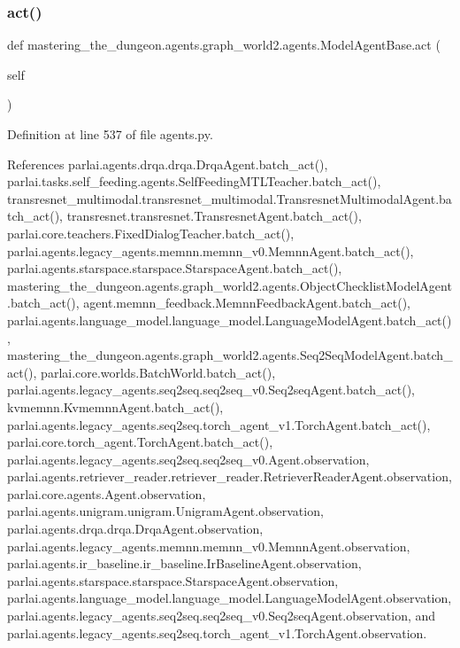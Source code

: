 \subsubsection{\texorpdfstring{act()}{act()}}
{\footnotesize\ttfamily def mastering\+\_\+the\+\_\+dungeon.\+agents.\+graph\+\_\+world2.\+agents.\+Model\+Agent\+Base.\+act (\begin{DoxyParamCaption}\item[{}]{self }\end{DoxyParamCaption})}



Definition at line 537 of file agents.\+py.



References parlai.\+agents.\+drqa.\+drqa.\+Drqa\+Agent.\+batch\+\_\+act(), parlai.\+tasks.\+self\+\_\+feeding.\+agents.\+Self\+Feeding\+M\+T\+L\+Teacher.\+batch\+\_\+act(), transresnet\+\_\+multimodal.\+transresnet\+\_\+multimodal.\+Transresnet\+Multimodal\+Agent.\+batch\+\_\+act(), transresnet.\+transresnet.\+Transresnet\+Agent.\+batch\+\_\+act(), parlai.\+core.\+teachers.\+Fixed\+Dialog\+Teacher.\+batch\+\_\+act(), parlai.\+agents.\+legacy\+\_\+agents.\+memnn.\+memnn\+\_\+v0.\+Memnn\+Agent.\+batch\+\_\+act(), parlai.\+agents.\+starspace.\+starspace.\+Starspace\+Agent.\+batch\+\_\+act(), mastering\+\_\+the\+\_\+dungeon.\+agents.\+graph\+\_\+world2.\+agents.\+Object\+Checklist\+Model\+Agent.\+batch\+\_\+act(), agent.\+memnn\+\_\+feedback.\+Memnn\+Feedback\+Agent.\+batch\+\_\+act(), parlai.\+agents.\+language\+\_\+model.\+language\+\_\+model.\+Language\+Model\+Agent.\+batch\+\_\+act(), mastering\+\_\+the\+\_\+dungeon.\+agents.\+graph\+\_\+world2.\+agents.\+Seq2\+Seq\+Model\+Agent.\+batch\+\_\+act(), parlai.\+core.\+worlds.\+Batch\+World.\+batch\+\_\+act(), parlai.\+agents.\+legacy\+\_\+agents.\+seq2seq.\+seq2seq\+\_\+v0.\+Seq2seq\+Agent.\+batch\+\_\+act(), kvmemnn.\+Kvmemnn\+Agent.\+batch\+\_\+act(), parlai.\+agents.\+legacy\+\_\+agents.\+seq2seq.\+torch\+\_\+agent\+\_\+v1.\+Torch\+Agent.\+batch\+\_\+act(), parlai.\+core.\+torch\+\_\+agent.\+Torch\+Agent.\+batch\+\_\+act(), parlai.\+agents.\+legacy\+\_\+agents.\+seq2seq.\+seq2seq\+\_\+v0.\+Agent.\+observation, parlai.\+agents.\+retriever\+\_\+reader.\+retriever\+\_\+reader.\+Retriever\+Reader\+Agent.\+observation, parlai.\+core.\+agents.\+Agent.\+observation, parlai.\+agents.\+unigram.\+unigram.\+Unigram\+Agent.\+observation, parlai.\+agents.\+drqa.\+drqa.\+Drqa\+Agent.\+observation, parlai.\+agents.\+legacy\+\_\+agents.\+memnn.\+memnn\+\_\+v0.\+Memnn\+Agent.\+observation, parlai.\+agents.\+ir\+\_\+baseline.\+ir\+\_\+baseline.\+Ir\+Baseline\+Agent.\+observation, parlai.\+agents.\+starspace.\+starspace.\+Starspace\+Agent.\+observation, parlai.\+agents.\+language\+\_\+model.\+language\+\_\+model.\+Language\+Model\+Agent.\+observation, parlai.\+agents.\+legacy\+\_\+agents.\+seq2seq.\+seq2seq\+\_\+v0.\+Seq2seq\+Agent.\+observation, and parlai.\+agents.\+legacy\+\_\+agents.\+seq2seq.\+torch\+\_\+agent\+\_\+v1.\+Torch\+Agent.\+observation.

